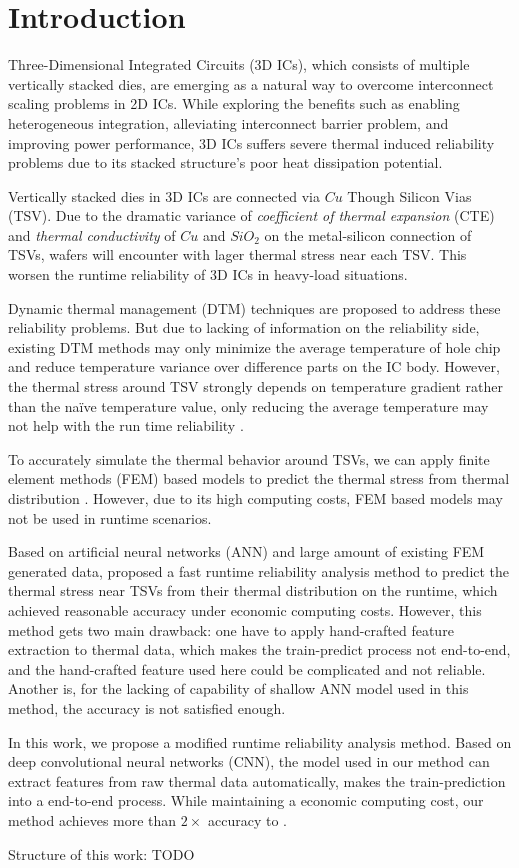 
\chapter{Introduction}
Three-Dimensional Integrated Circuits (3D ICs),
which consists of multiple vertically stacked dies, 
are emerging as a natural way to overcome interconnect scaling problems in 2D ICs.
While exploring the benefits such as enabling heterogeneous integration, 
alleviating interconnect barrier problem, and improving power performance, 
3D ICs suffers severe thermal induced reliability problems due to its
stacked structure's poor heat dissipation potential.

Vertically stacked dies in 3D ICs are connected via $Cu$ Though Silicon Vias (TSV)\cite{Beyne2008Through}. 
Due to the dramatic variance of 
\textit{coefficient of thermal expansion} (CTE) and \textit{thermal conductivity}
of $Cu$ and $SiO_2$ on the metal-silicon connection of TSVs, 
wafers will encounter with lager thermal stress near each TSV.
This worsen the runtime reliability of 3D ICs in heavy-load situations.

Dynamic thermal management (DTM) techniques are proposed to address these reliability
problems. But due to lacking of information on the reliability side, existing DTM 
methods may only minimize the average temperature of hole chip and reduce temperature
variance over difference parts on the IC body\cite{Zou2013Thermomechanical}.
However, the thermal stress around TSV strongly depends on temperature gradient rather
than the na\"ive temperature value, only reducing the average temperature may not help with
the run time reliability \cite{Zhang2016Fast}.

To accurately simulate the thermal behavior around TSVs, we can apply finite element methods (FEM)
based models to predict the thermal stress from thermal distribution \cite{Lu2009Thermo}. 
However, due to its high computing costs, FEM based models may not be used in runtime scenarios.

Based on artificial neural networks (ANN) and large amount of existing FEM generated data, 
\cite{Zhang2016Fast} proposed a fast runtime reliability analysis method to predict the 
thermal stress near TSVs from their thermal distribution on the
runtime, which achieved reasonable accuracy under economic computing costs.
However, this method gets two main drawback: one have to apply hand-crafted feature extraction to
thermal data, which makes the train-predict process not end-to-end, and the hand-crafted feature used here
could be complicated and not reliable. Another is, 
for the lacking of capability of shallow ANN model used in this method, 
the accuracy is not satisfied enough.

In this work, we propose a modified runtime reliability analysis method.
Based on deep convolutional neural networks (CNN), the model used in our method can extract features from raw
thermal data automatically, makes the train-prediction into a end-to-end process.
While maintaining a economic computing cost, our method achieves more than $2\times$ accuracy to \cite{Zhang2016Fast}.

Structure of this work: TODO

